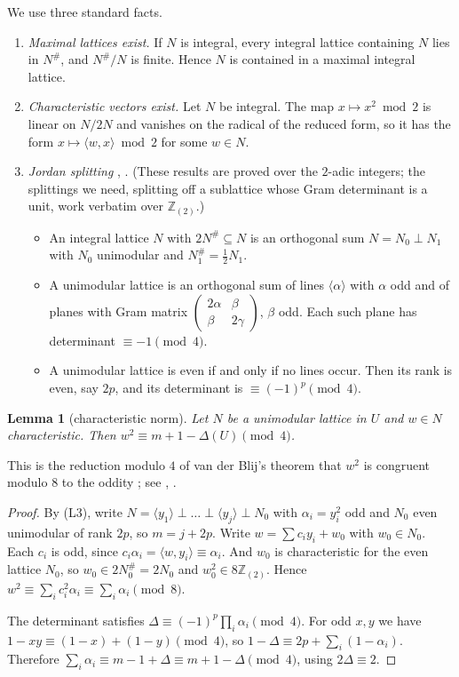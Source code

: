 \documentclass[11pt]{article}
\newtheorem{lemma}[theorem]{Lemma}
\theoremstyle{definition}
\theoremstyle{remark}
\newcommand{\Z}{\mathbb Z}
\newcommand{\Zt}{\Z_{(2)}}
\newcommand{\ip}[2]{\langle #1,#2\rangle}
\begin{document}
We use three standard facts.
\begin{enumerate}[label=(L\arabic*)]
\item \emph{Maximal lattices exist.} If $N$ is integral, every integral lattice
containing $N$ lies in $N^\#$, and $N^\#/N$ is finite. Hence $N$ is contained in
a maximal integral lattice.
\item \emph{Characteristic vectors exist.} Let $N$ be integral. The map
$x\mapsto x^2\bmod2$ is linear on $N/2N$ and vanishes on the radical of the
reduced form, so it has the form $x\mapsto\ip wx\bmod 2$ for some $w\in N$.
\item \emph{Jordan splitting} \cite[\S\S91--93]{OMeara},
\cite[Ch.~8]{Cassels}. (These results are proved over the $2$-adic integers;
the splittings we need, splitting off a sublattice whose Gram determinant is a
unit, work verbatim over $\Zt$.)
\begin{itemize}
\item An integral lattice $N$ with $2N^\#\subseteq N$ is an orthogonal sum
$N=N_0\perp N_1$ with $N_0$ unimodular and $N_1^\#=\tfrac12N_1$.
\item A unimodular lattice is an orthogonal sum of lines $\langle\alpha\rangle$
with $\alpha$ odd and of planes with Gram matrix
$\left(\begin{smallmatrix}2\alpha&\beta\\ \beta&2\gamma\end{smallmatrix}\right)$,
$\beta$ odd. Each such plane has determinant $\equiv-1\pmod 4$.
\item A unimodular lattice is even if and only if no lines occur. Then its rank
is even, say $2p$, and its determinant is $\equiv(-1)^p\pmod4$.
\end{itemize}
\end{enumerate}

\begin{lemma}[characteristic norm]\label{lem:charnorm}
Let $N$ be a unimodular lattice in $U$ and $w\in N$ characteristic. Then
$w^2\equiv m+1-\Delta(U)\pmod 4$.
\end{lemma}

This is the reduction modulo $4$ of van der Blij's theorem that $w^2$ is
congruent modulo $8$ to the oddity \cite{vdB}; see \cite[Ch.~II]{MH},
\cite[Ch.~15]{CS}.

\begin{proof}
By (L3), write $N=\langle y_1\rangle\perp\dots\perp\langle y_j\rangle\perp N_0$
with $\alpha_i=y_i^2$ odd and $N_0$ even unimodular of rank $2p$, so $m=j+2p$.
Write $w=\sum c_iy_i+w_0$ with $w_0\in N_0$. Each $c_i$ is odd, since
$c_i\alpha_i=\ip w{y_i}\equiv\alpha_i$. And $w_0$ is characteristic for the
even lattice $N_0$, so $w_0\in2N_0^\#=2N_0$ and $w_0^2\in8\Zt$. Hence
$w^2\equiv\sum_ic_i^2\alpha_i\equiv\sum_i\alpha_i\pmod 8$.

The determinant satisfies $\Delta\equiv(-1)^p\prod_i\alpha_i\pmod 4$. For odd
$x,y$ we have $1-xy\equiv(1-x)+(1-y)\pmod 4$, so
$1-\Delta\equiv2p+\sum_i(1-\alpha_i)$. Therefore
$\sum_i\alpha_i\equiv m-1+\Delta\equiv m+1-\Delta\pmod 4$, using
$2\Delta\equiv2$.
\end{proof}
\end{document}
